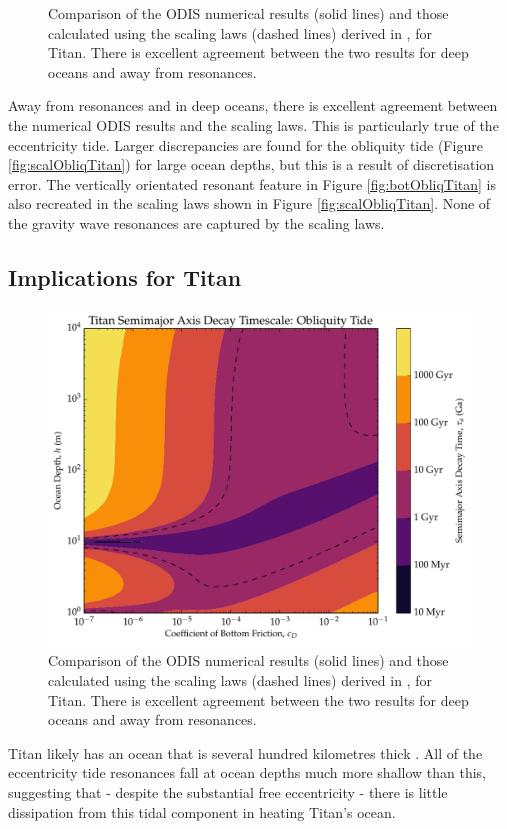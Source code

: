 \begin{figure}[!t]
\begin{subfigure}{0.4\linewidth}
\subcaption{\label{fig:scalObliqTitan}}
\end{subfigure}
\vspace*{-0.8cm}
\caption{Comparison of the ODIS numerical results (solid lines) and those calculated using the scaling laws (dashed lines) derived in \citet{chen2013tidal}, for Titan. There is excellent agreement between the two results for deep oceans and away from resonances. \label{fig:scalTitan}}
\end{figure}

Away from resonances and in deep oceans, there is excellent agreement between the numerical ODIS results and the scaling laws. This is particularly true of the eccentricity tide. Larger discrepancies are found for the obliquity tide (Figure \ref{fig:scalObliqTitan}) for large ocean depths, but this is a result of discretisation error. The vertically orientated resonant feature in Figure \ref{fig:botObliqTitan} is also recreated in the scaling laws shown in Figure \ref{fig:scalObliqTitan}. None of the gravity wave resonances are captured by the scaling laws. 

\subsection{Implications for Titan}

\begin{figure}[!t]
\centering
\includegraphics[width=0.5\linewidth]{Figures/a_decay}
\caption{Comparison of the ODIS numerical results (solid lines) and those calculated using the scaling laws (dashed lines) derived in \citet{chen2013tidal}, for Titan. There is excellent agreement between the two results for deep oceans and away from resonances. \label{fig:a_evo}}
\end{figure}

Titan likely has an ocean that is several hundred kilometres thick \citep{sohl2003interior}. All of the eccentricity tide resonances fall at ocean depths much more shallow than this, suggesting that - despite the substantial free eccentricity - there is little dissipation from this tidal component in heating Titan's ocean.

